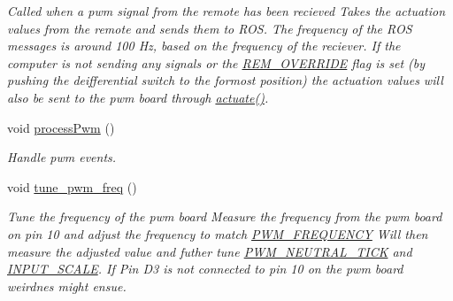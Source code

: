 \begin{DoxyCompactItemize}
\begin{DoxyCompactList}\small\item\em Called when a pwm signal from the remote has been recieved Takes the actuation values from the remote and sends them to R\+OS. The frequency of the R\+OS messages is around 100 Hz, based on the frequency of the reciever. If the computer is not sending any signals or the \hyperlink{group__StatusVariables_gae31e17311163c382d2de940091954419}{R\+E\+M\+\_\+\+O\+V\+E\+R\+R\+I\+DE} flag is set (by pushing the deifferential switch to the formost position) the actuation values will also be sent to the pwm board through \hyperlink{group__Functions_gaa5545eb35f187e5fd11a483a265bed7b}{actuate()}. \end{DoxyCompactList}\item 
void \hyperlink{group__GlobalVariables_gaf99fa97e441e842b197dacc4a1a95a99}{process\+Pwm} ()
\begin{DoxyCompactList}\small\item\em Handle pwm events. \end{DoxyCompactList}\item 
void \hyperlink{group__GlobalVariables_gab3d64504be0ebfe1754aec5485ddbb72}{tune\+\_\+pwm\+\_\+freq} ()\hypertarget{group__GlobalVariables_gab3d64504be0ebfe1754aec5485ddbb72}{}\label{group__GlobalVariables_gab3d64504be0ebfe1754aec5485ddbb72}

\begin{DoxyCompactList}\small\item\em Tune the frequency of the pwm board Measure the frequency from the pwm board on pin 10 and adjust the frequency to match \hyperlink{group__ActuationToOutput_ga1e7ca795ca78a0b20f4fbc06ea505cfb}{P\+W\+M\+\_\+\+F\+R\+E\+Q\+U\+E\+N\+CY} Will then measure the adjusted value and futher tune \hyperlink{group__ActuationToOutput_gaa6aecad7bb848a436df0b7c89aa1f48f}{P\+W\+M\+\_\+\+N\+E\+U\+T\+R\+A\+L\+\_\+\+T\+I\+CK} and \hyperlink{group__ActuationToOutput_ga8e7323c31db382601e81947c2bba345b}{I\+N\+P\+U\+T\+\_\+\+S\+C\+A\+LE}. If Pin D3 is not connected to pin 10 on the pwm board weirdnes might ensue. \end{DoxyCompactList}\end{DoxyCompactItemize}
